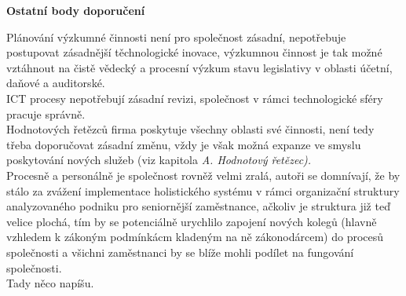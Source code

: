 \noindent\textbf{Ostatní body doporučení}

Plánování výzkumné činnosti není pro společnost zásadní, nepotřebuje postupovat zásadnější těchnologické inovace, výzkumnou činnost je tak možné vztáhnout na čistě vědecký a procesní výzkum stavu legislativy v oblasti účetní, daňové a auditorské.\\

ICT procesy nepotřebují zásadní revizi, společnost v rámci technologické sféry pracuje správně.\\

Hodnotových řetězců firma poskytuje všechny oblasti své činnosti, není tedy třeba doporučovat zásadní změnu, vždy je však možná expanze ve smyslu poskytování nových služeb (viz kapitola \textit{A. Hodnotový řetězec).}\\

Procesně a personálně je společnost rovněž velmi zralá, autoři se domnívají, že by stálo za zvážení implementace holistického systému v rámci organizační struktury analyzovaného podniku pro seniornější zaměstnance, ačkoliv je struktura již teď velice plochá, tím by se potenciálně urychlilo zapojení nových kolegů (hlavně vzhledem k zákoným podmínkácm kladeným na ně zákonodárcem) do procesů společnosti a všichni zaměstnanci by se blíže mohli podílet na fungování společnosti.\\




Tady něco napíšu.

